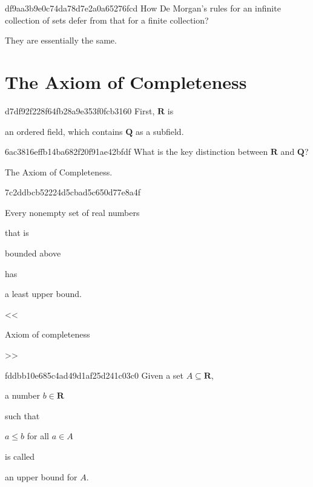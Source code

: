 \begin{note}{df9aa3b9e0c74da78d7e2a0a65276fcd}
    How De Morgan's rules for an infinite collection of sets defer from that for a finite collection?

    \begin{cloze}{1}
        They are essentially the same.
    \end{cloze}
\end{note}

\section{The Axiom of Completeness}
\begin{note}{d7df92f228f64fb28a9e353f0fcb3160}
    First, \({ \mathbf{R} }\) is \begin{icloze}{1}an ordered field, which contains \({ \mathbf{Q} }\) as a subfield.\end{icloze}
\end{note}

\begin{note}{6ac3816effb14ba682f20f91ae42bfdf}
    What is the key distinction between \({ \mathbf{R} }\) and \({ \mathbf{Q} }\)?

    \begin{cloze}{1}
        The Axiom of Completeness.
    \end{cloze}
\end{note}

\begin{note}{7c2ddbcb52224d5cbad5c650d77e8a4f}
    \begin{icloze}{1}Every nonempty set of real numbers\end{icloze} that is \begin{icloze}{2}bounded above\end{icloze} has \begin{icloze}{3}a least upper bound.\end{icloze}

    \begin{center}
        \tiny
        <<\begin{icloze}{4}Axiom of completeness\end{icloze}>>
    \end{center}
\end{note}

\begin{note}{fddbb10e685c4ad49d1af25d241c03c0}
    Given a set \({ A \subseteq \mathbf{R} }\), \begin{icloze}{3}a number \({ b \in \mathbf{R} }\)\end{icloze} such that \begin{icloze}{2}\({ a \leq b }\) for all \({ a \in A }\)\end{icloze} is called \begin{icloze}{1}an upper bound for \({ A }\).\end{icloze}
\end{note}

